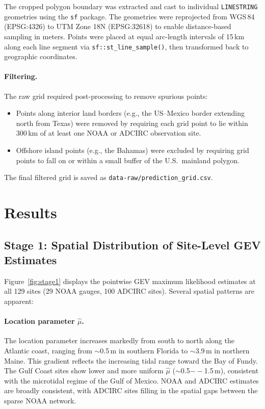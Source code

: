 \documentclass[11pt]{article}
\begin{document}
The cropped polygon boundary was extracted and cast to individual \texttt{LINESTRING} geometries using the \texttt{sf} package. The geometries were reprojected from WGS\,84 (EPSG:4326) to UTM Zone 18N (EPSG:32618) to enable distance-based sampling in meters. Points were placed at equal arc-length intervals of 15\,km along each line segment via \texttt{sf::st\_line\_sample()}, then transformed back to geographic coordinates.

\paragraph{Filtering.} The raw grid required post-processing to remove spurious points:
\begin{itemize}[nosep]
    \item Points along interior land borders (e.g., the US--Mexico border extending north from Texas) were removed by requiring each grid point to lie within 300\,km of at least one NOAA or ADCIRC observation site.
    \item Offshore island points (e.g., the Bahamas) were excluded by requiring grid points to fall on or within a small buffer of the U.S.\ mainland polygon.
\end{itemize}
The final filtered grid is saved as \texttt{data-raw/prediction\_grid.csv}.

\section{Results}
\label{sec:results}

\subsection{Stage 1: Spatial Distribution of Site-Level GEV Estimates}

Figure~\ref{fig:stage1} displays the pointwise GEV maximum likelihood estimates at all 129 sites (29 NOAA gauges, 100 ADCIRC sites). Several spatial patterns are apparent:

\paragraph{Location parameter $\hat{\mu}$.} The location parameter increases markedly from south to north along the Atlantic coast, ranging from $\sim$0.5\,m in southern Florida to $\sim$3.9\,m in northern Maine. This gradient reflects the increasing tidal range toward the Bay of Fundy. The Gulf Coast sites show lower and more uniform $\hat{\mu}$ ($\sim$0.5$--$1.5\,m), consistent with the microtidal regime of the Gulf of Mexico. NOAA and ADCIRC estimates are broadly consistent, with ADCIRC sites filling in the spatial gaps between the sparse NOAA network.
\end{document}
